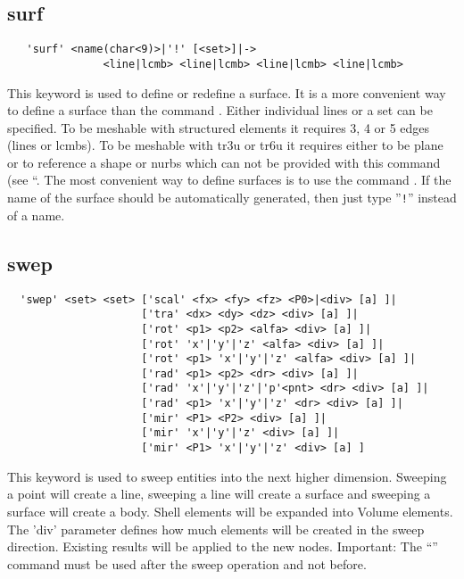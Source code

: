 \documentclass{article}
\begin{document}
\subsection{\label{surf}surf}
\begin{verbatim}
   'surf' <name(char<9)>|'!' [<set>]|->
               <line|lcmb> <line|lcmb> <line|lcmb> <line|lcmb>  
\end{verbatim}
This keyword is used to define or redefine a surface. It is a more convenient way to define a surface than the command . Either individual lines or a set can be specified. To be meshable with structured elements it requires 3, 4 or 5 edges (lines or lcmbs). To be meshable with tr3u or tr6u it requires either to be plane or to reference a shape or nurbs which can not be provided with this command (see ``. The most convenient way to define surfaces is to use the command . 
If the name of the surface should be automatically generated, then just type ''\verb_!_'' instead of a name.

\subsection{\label{swep}swep}
\begin{verbatim}
  'swep' <set> <set> ['scal' <fx> <fy> <fz> <P0>|<div> [a] ]|
                     ['tra' <dx> <dy> <dz> <div> [a] ]|
                     ['rot' <p1> <p2> <alfa> <div> [a] ]|
                     ['rot' 'x'|'y'|'z' <alfa> <div> [a] ]|
                     ['rot' <p1> 'x'|'y'|'z' <alfa> <div> [a] ]|
                     ['rad' <p1> <p2> <dr> <div> [a] ]|
                     ['rad' 'x'|'y'|'z'|'p'<pnt> <dr> <div> [a] ]|
                     ['rad' <p1> 'x'|'y'|'z' <dr> <div> [a] ]|
                     ['mir' <P1> <P2> <div> [a] ]|
                     ['mir' 'x'|'y'|'z' <div> [a] ]|
                     ['mir' <P1> 'x'|'y'|'z' <div> [a] ] 
\end{verbatim}
This keyword is used to sweep entities into the next higher dimension. Sweeping a point will create a line, sweeping a line will create a surface and sweeping a surface will create a body. Shell elements will be expanded into Volume elements. The 'div' parameter defines how much elements will be created in the sweep direction. Existing results will be applied to the new nodes. Important: The ``'' command must be used after the sweep operation and not before.
\end{document}

